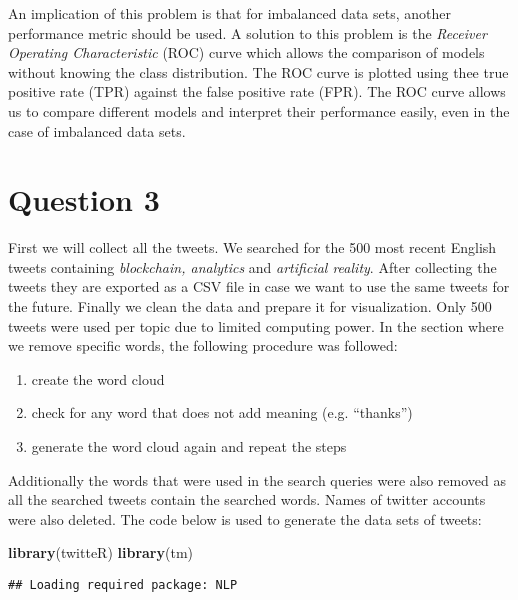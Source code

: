 \documentclass[]{article}
\newenvironment{Shaded}{\begin{snugshade}}{\end{snugshade}}
\newcommand{\KeywordTok}[1]{\textcolor[rgb]{0.13,0.29,0.53}{\textbf{#1}}}
\newcommand{\NormalTok}[1]{#1}
\providecommand{\tightlist}{%
  \setlength{\itemsep}{0pt}\setlength{\parskip}{0pt}}
\begin{document}
An implication of this problem is that for imbalanced data sets, another
performance metric should be used. A solution to this problem is the
\emph{Receiver Operating Characteristic} (ROC) curve which allows the
comparison of models without knowing the class distribution. The ROC
curve is plotted using thee true positive rate (TPR) against the false
positive rate (FPR). The ROC curve allows us to compare different models
and interpret their performance easily, even in the case of imbalanced
data sets.

\section{Question 3}\label{question-3}

First we will collect all the tweets. We searched for the 500 most
recent English tweets containing \emph{blockchain, analytics} and
\emph{artificial reality}. After collecting the tweets they are exported
as a CSV file in case we want to use the same tweets for the future.
Finally we clean the data and prepare it for visualization. Only 500
tweets were used per topic due to limited computing power. In the
section where we remove specific words, the following procedure was
followed:

\begin{enumerate}
\def\labelenumi{\arabic{enumi}.}
\tightlist
\item
  create the word cloud
\item
  check for any word that does not add meaning (e.g. ``thanks'')
\item
  generate the word cloud again and repeat the steps
\end{enumerate}

Additionally the words that were used in the search queries were also
removed as all the searched tweets contain the searched words. Names of
twitter accounts were also deleted. The code below is used to generate
the data sets of tweets:

\begin{Shaded}
\begin{Highlighting}[]
\KeywordTok{library}\NormalTok{(twitteR)}
\KeywordTok{library}\NormalTok{(tm)}
\end{Highlighting}
\end{Shaded}

\begin{verbatim}
## Loading required package: NLP
\end{verbatim}
\end{document}
